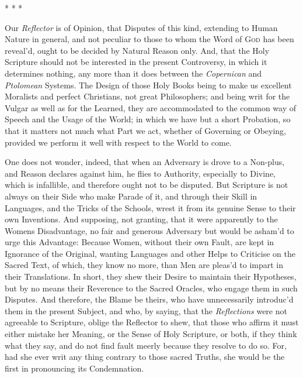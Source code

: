\begin{center}* * *\end{center}

Our \textit{Reflector} is of Opinion, that Disputes of this
kind, extending to Human Nature in general, and not peculiar to those
to whom the Word of \textsc{God} has been reveal'd, ought to be
decided by Natural Reason only. And, that the Holy Scripture should
not be interested in the present Controversy, in which it determines
nothing, any more than it does between the \textit{Copernican} and
\textit{Ptolomean} Systems. The Design of those Holy Books being to
make us excellent Moralists and perfect Christians, not great
Philosophers; and being writ for the Vulgar as well as for the
Learned, they are accommodated to the common way of Speech and the
Usage of the World; in which we have but a short Probation, so that it
matters not much what Part we act, whether of Governing or Obeying,
provided we perform it well with respect to the World to come.

One does not wonder, indeed, that when an Adversary is drove to a
Non-plus, and Reason declares against him, he flies to
Authority, especially to Divine, which is infallible, and therefore
ought not to be disputed. But Scripture is not always on their Side
who make Parade of it, and through their Skill in Languages, and the
Tricks of the Schools, wrest it from its genuine Sense to their own
Inventions. And supposing, not granting, that it were apparently to
the Womens Disadvantage, no fair and generous Adversary but would be
asham'd to urge this Advantage: Because Women, without their own
Fault, are kept in Ignorance of the Original, wanting Languages and
other Helps to Criticise on the Sacred Text, of which, they know no
more, than Men are pleas'd to impart in their Translations. In short,
they shew their Desire to maintain their Hypotheses, but by no means
their Reverence to the Sacred Oracles, who engage them in such
Disputes. And therefore, the Blame be theirs, who have unnecessarily
introduc'd them in  the present Subject, and who, by saying,
that the \textit{Reflections} were not agreeable to Scripture, oblige
the Reflector to shew, that those who affirm it must either mistake
her Meaning, or the Sense of Holy Scripture, or both, if they think
what they say, and do not find fault meerly because they resolve to do
so. For, had she ever writ any thing contrary to those sacred Truths,
she would be the first in pronouncing its Condemnation.

